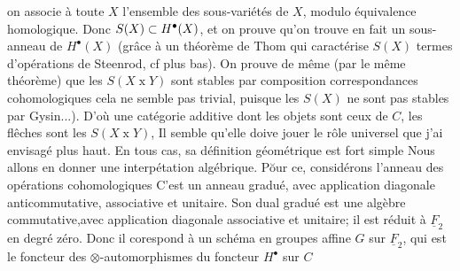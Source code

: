 
 

 on associe à toute $X$  l'ensemble  des sous-variétés  de $X$, modulo équivalence homologique. Donc $S(X)\subset H^{\bullet}(X)$, et on prouve qu'on trouve en fait un sous-anneau de $H^{\bullet}(X)$ (grâce à un théorème de Thom qui caractérise $S(X)$  termes d'opérations de Steenrod, cf plus bas). On prouve de même (par le même théorème) que les $S(X\mathbin{x}Y)$ sont stables par composition  correspondances cohomologiques\handwritten{(} cela ne semble pas trivial, puisque les $S(X)$ ne sont pas stables par Gysin...). D'où une catégorie additive dont les objets sont ceux de $C$, les flêches sont les  $S(X\mathbin{x}Y)$, Il semble qu'elle doive jouer le rôle universel que j'ai envisagé plus haut. En tous cas, sa définition géométrique est fort simple Nous allons en donner une interpétation algébrique. Pŏur ce, considérons l'anneau des opérations cohomologiques    C'est un anneau gradué, avec application diagonale anticommutative, associative et unitaire. Son dual gradué est une algèbre  commutative,avec application diagonale associative et unitaire; il est réduit à $\underline F_2$ en degré zéro. Donc il corespond à un schéma en groupes affine $G$ sur $\underline F_2$, qui est  le foncteur des $\otimes$-automorphismes  du foncteur $H^{\bullet}$ sur $C$ 

